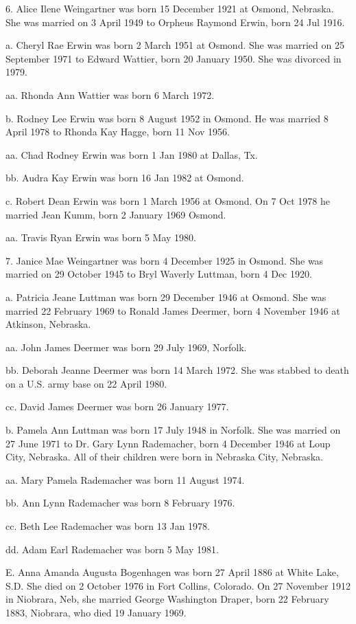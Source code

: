 \documentclass[a4paper]{article}
\begin{document}
6. Alice Ilene Weingartner was born 15 December 1921 at Osmond, Nebraska. She was married on 3 April 1949 to Orpheus Raymond Erwin, born 24 Jul 1916.

a. Cheryl Rae Erwin was born 2 March 1951 at Osmond.  She was married on 25 September 1971 to Edward Wattier, born 20 January 1950. She was divorced in 1979.

aa. Rhonda Ann Wattier was born 6 March 1972.

b. Rodney Lee Erwin was born 8 August 1952 in Osmond.  He was married 8 April 1978 to Rhonda Kay Hagge, born 11 Nov 1956.

aa. Chad Rodney Erwin was born 1 Jan 1980 at Dallas, Tx.

bb. Audra Kay Erwin was born 16 Jan 1982 at Osmond.

c. Robert Dean Erwin was born 1 March 1956 at Osmond. On 7 Oct 1978 he married Jean Kumm, born 2 January 1969 Osmond.

aa. Travis Ryan Erwin was born 5 May 1980.

7. Janice Mae Weingartner was born 4 December 1925 in Osmond.  She was married on 29 October 1945 to Bryl Waverly Luttman, born 4 Dec 1920.
 
a. Patricia Jeane Luttman was born 29 December 1946 at Osmond. She was married 22 February 1969 to Ronald James Deermer, born 4 November 1946 at Atkinson, Nebraska.
 
aa. John James Deermer was born 29 July 1969, Norfolk.

bb. Deborah Jeanne Deermer was born 14 March 1972.  She was stabbed to death on a U.S. army base on 22 April 1980.

cc. David James Deermer was born 26 January 1977.

b. Pamela Ann Luttman was born 17 July 1948 in Norfolk.  She was married on 27 June 1971 to Dr. Gary Lynn Rademacher, born 4 December 1946 at Loup City, Nebraska. All of their children were born in Nebraska City, Nebraska.

aa. Mary Pamela Rademacher was born 11 August 1974.

bb. Ann Lynn Rademacher was born 8 February 1976.

cc. Beth Lee Rademacher was born 13 Jan 1978.

dd. Adam Earl Rademacher was born 5 May 1981.

E. Anna Amanda Augusta Bogenhagen was born 27 April 1886 at White Lake, S.D.  She died on 2 October 1976 in Fort Collins, Colorado.  On 27 November 1912 in Niobrara, Neb, she married George Washington Draper, born 22 February 1883, Niobrara, who died 19 January 1969.
\end{document}
